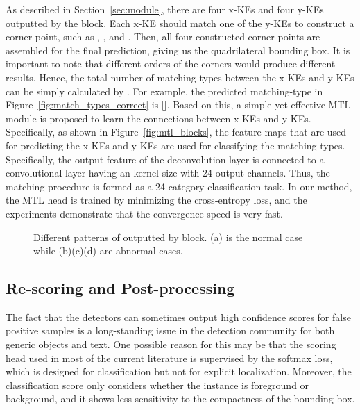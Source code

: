 As described in Section~\ref{sec:module}, there are four x-KEs and four y-KEs outputted by the \Ours block. Each x-KE should match one of the y-KEs to construct a corner point, such as , , and . Then, all four constructed corner points are assembled for the final prediction, giving us the quadrilateral bounding box. It is important to note that different orders of the corners would produce different results. 
Hence, the total number of matching-types between the x-KEs and y-KEs can be simply calculated by . For example, the predicted matching-type in Figure~\ref{fig:match_types_correct} is []. Based on this, a simple yet effective MTL module is proposed to learn the connections between x-KEs and y-KEs. Specifically, as shown in Figure~\ref{fig:mtl_blocks}, the feature maps that are used for predicting the x-KEs and y-KEs are used for classifying the matching-types. Specifically, the output feature of the deconvolution layer is connected to a convolutional layer having an  kernel size with 24 output channels. Thus, the matching procedure is formed as a 24-category classification task. In our method, the MTL head is trained by minimizing the cross-entropy loss, and the experiments demonstrate that the convergence speed is very fast. 


\begin{figure}[t!]
    \centering
    \hspace{0.05cm}
    
    \hspace{0.05cm}
    \caption{Different patterns of  outputted by    \Ours   block. (a) is the normal case while (b)(c)(d) are abnormal cases.}
    \label{fig:KE_score_pattern}
\end{figure}

\subsection{Re-scoring and Post-processing}


The fact that the detectors can sometimes output high confidence scores for false positive samples is a long-standing issue in the detection community for both generic objects and text. One possible reason for this may be that the scoring head used in most of the current literature is supervised by the softmax loss, which is designed for classification but not for explicit localization. Moreover, the classification score only considers whether the instance is foreground or background, and it shows less sensitivity to the compactness of the bounding box.

